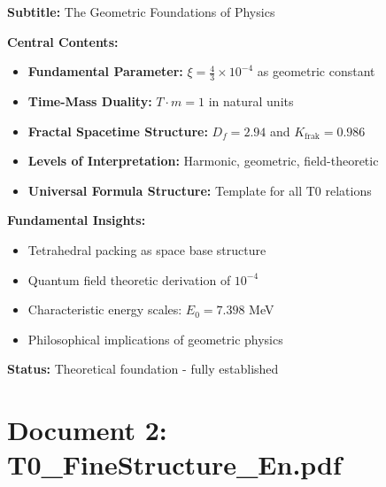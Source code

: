 \documentclass[12pt,a4paper]{article}
\newcommand{\xipar}{\xi}
\begin{document}
	\begin{documentbox}
		\textbf{Subtitle:} The Geometric Foundations of Physics
		
		\textbf{Central Contents:}
		\begin{itemize}
			\item \textbf{Fundamental Parameter:} $\xipar = \frac{4}{3} \times 10^{-4}$ as geometric constant
			\item \textbf{Time-Mass Duality:} $T \cdot m = 1$ in natural units
			\item \textbf{Fractal Spacetime Structure:} $D_f = 2.94$ and $K_{\text{frak}} = 0.986$
			\item \textbf{Levels of Interpretation:} Harmonic, geometric, field-theoretic
			\item \textbf{Universal Formula Structure:} Template for all T0 relations
		\end{itemize}
		
		\textbf{Fundamental Insights:}
		\begin{itemize}
			\item Tetrahedral packing as space base structure
			\item Quantum field theoretic derivation of $10^{-4}$
			\item Characteristic energy scales: $E_0 = 7.398$ MeV
			\item Philosophical implications of geometric physics
		\end{itemize}
		
		\textbf{Status:} Theoretical foundation - fully established
	\end{documentbox}
	
	\section{Document 2: T0\_FineStructure\_En.pdf}
	
\end{document}
